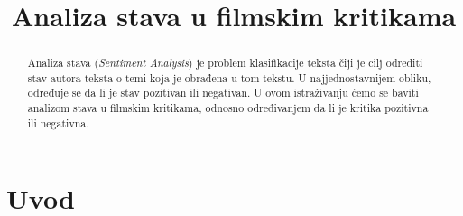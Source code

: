 \documentclass[conference]{IEEEtran}
\begin{document}
\title{Analiza stava u filmskim kritikama}


\author{
	\and
	\and
}

\maketitle

\begin{abstract}
Analiza stava (\textit{Sentiment Analysis}) je problem klasifikacije teksta čiji je cilj odrediti stav autora teksta o temi koja je obrađena u tom tekstu. U najjednostavnijem obliku, određuje se da li je stav pozitivan ili negativan. U ovom istraživanju ćemo se baviti analizom stava u filmskim kritikama, odnosno određivanjem da li je kritika pozitivna ili negativna.
\end{abstract}

\IEEEpeerreviewmaketitle

\section{Uvod}
\end{document}
